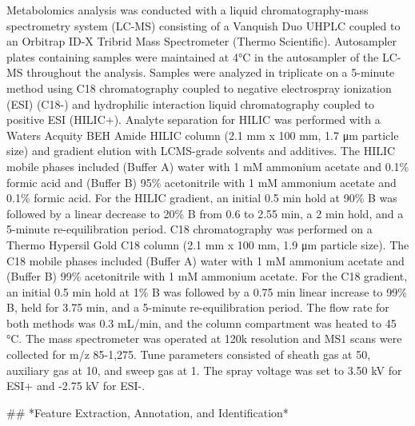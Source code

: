 Metabolomics analysis was conducted with a liquid chromatography-mass spectrometry system (LC-MS) consisting of a Vanquish Duo UHPLC coupled to an Orbitrap ID-X Tribrid Mass Spectrometer (Thermo Scientific). Autosampler plates containing samples were maintained at 4°C in the autosampler of the LC-MS throughout the analysis. Samples were analyzed in triplicate on a 5-minute method using C18 chromatography coupled to negative electrospray ionization (ESI) (C18-) and hydrophilic interaction liquid chromatography coupled to positive ESI (HILIC+). Analyte separation for HILIC was performed with a Waters Acquity BEH Amide HILIC column (2.1 mm x 100 mm, 1.7 μm particle size) and gradient elution with LCMS-grade solvents and additives. The HILIC mobile phases included (Buffer A) water with 1 mM ammonium acetate and 0.1\% formic acid and (Buffer B) 95\% acetonitrile with 1 mM ammonium acetate and 0.1\% formic acid. For the HILIC gradient, an initial 0.5 min hold at 90\% B was followed by a linear decrease to 20\% B from 0.6 to 2.55 min, a 2 min hold, and a 5-minute re-equilibration period. C18 chromatography was performed on a Thermo Hypersil Gold C18 column (2.1 mm x 100 mm, 1.9 μm particle size). The C18 mobile phases included (Buffer A) water with 1 mM ammonium acetate and (Buffer B) 99\% acetonitrile with 1 mM ammonium acetate. For the C18 gradient, an initial 0.5 min hold at 1\% B was followed by a 0.75 min linear increase to 99\% B, held for 3.75 min, and a 5-minute re-equilibration period. The flow rate for both methods was 0.3 mL/min, and the column compartment was heated to 45 °C. The mass spectrometer was operated at 120k resolution and MS1 scans were collected for m/z 85-1,275. Tune parameters consisted of sheath gas at 50, auxiliary gas at 10, and sweep gas at 1. The spray voltage was set to 3.50 kV for ESI+ and -2.75 kV for ESI-.

## *Feature Extraction, Annotation, and Identification*


